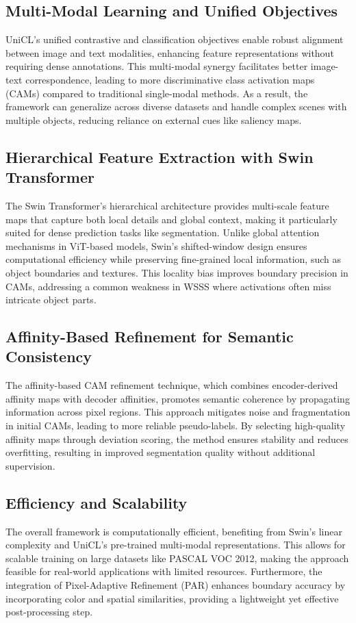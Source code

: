 \subsection{Multi-Modal Learning and Unified Objectives}
UniCL's unified contrastive and classification objectives enable robust alignment between image and text modalities, enhancing feature representations without requiring dense annotations. This multi-modal synergy facilitates better image-text correspondence, leading to more discriminative class activation maps (CAMs) compared to traditional single-modal methods. As a result, the framework can generalize across diverse datasets and handle complex scenes with multiple objects, reducing reliance on external cues like saliency maps.

\subsection{Hierarchical Feature Extraction with Swin Transformer}
The Swin Transformer's hierarchical architecture provides multi-scale feature maps that capture both local details and global context, making it particularly suited for dense prediction tasks like segmentation. Unlike global attention mechanisms in ViT-based models, Swin's shifted-window design ensures computational efficiency while preserving fine-grained local information, such as object boundaries and textures. This locality bias improves boundary precision in CAMs, addressing a common weakness in WSSS where activations often miss intricate object parts.

\subsection{Affinity-Based Refinement for Semantic Consistency}
The affinity-based CAM refinement technique, which combines encoder-derived affinity maps with decoder affinities, promotes semantic coherence by propagating information across pixel regions. This approach mitigates noise and fragmentation in initial CAMs, leading to more reliable pseudo-labels. By selecting high-quality affinity maps through deviation scoring, the method ensures stability and reduces overfitting, resulting in improved segmentation quality without additional supervision.

\subsection{Efficiency and Scalability}
The overall framework is computationally efficient, benefiting from Swin's linear complexity and UniCL's pre-trained multi-modal representations. This allows for scalable training on large datasets like PASCAL VOC 2012, making the approach feasible for real-world applications with limited resources. Furthermore, the integration of Pixel-Adaptive Refinement (PAR) enhances boundary accuracy by incorporating color and spatial similarities, providing a lightweight yet effective post-processing step.

